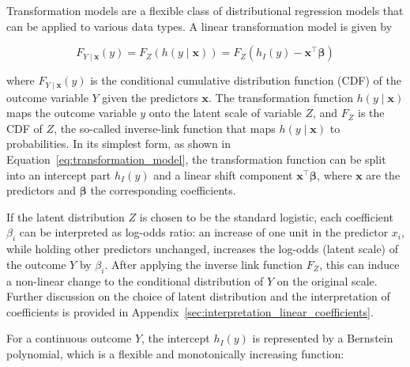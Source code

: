 
Transformation models are a flexible class of distributional regression models that can be applied to various data types. A linear transformation model is given by

\begin{equation}
F_{Y \mid \mathbf{x}}(y) = F_Z(h(y \mid \mathbf{x})) =  F_Z(h_I(y) - \mathbf{x}^\top \boldsymbol{\beta})
\label{eq:transformation_model}
\end{equation}

where $F_{Y \mid \mathbf{x}}(y)$ is the conditional cumulative distribution function (CDF) of the outcome variable $Y$ given the predictors $\mathbf{x}$. The transformation function $h(y \mid \mathbf{x})$ maps the outcome variable $y$ onto the latent scale of variable $Z$, and $F_Z$ is the CDF of $Z$, the so-called inverse-link function that maps $h(y \mid \mathbf{x})$ to probabilities. In its simplest form, as shown in Equation~\ref{eq:transformation_model}, the transformation function can be split into an intercept part $h_I(y)$ and a linear shift component $\mathbf{x}^\top \boldsymbol{\beta}$, where $\mathbf{x}$ are the predictors and $\boldsymbol{\beta}$ the corresponding coefficients.

If the latent distribution $Z$ is chosen to be the standard logistic, each coefficient $\beta_i$ can be interpreted as log-odds ratio: an increase of one unit in the predictor $x_i$, while holding other predictors unchanged, increases the log-odds (latent scale) of the outcome $Y$ by $\beta_i$. After applying the inverse link function $F_Z$, this can induce a non-linear change to the conditional distribution of $Y$ on the original scale. Further discussion on the choice of latent distribution and the interpretation of coefficients is provided in Appendix~\ref{sec:interpretation_linear_coefficients}.

For a continuous outcome $Y$, the intercept $h_I(y)$ is represented by a Bernstein polynomial, which is a flexible and monotonically increasing function:

